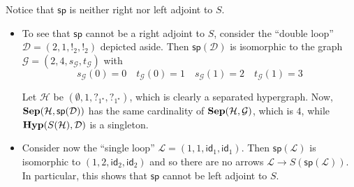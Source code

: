 \documentclass[3p]{elsarticle}
\newcommand{\catname}[1]{\textbf{\textup{#1}}}
\newcommand{\hyp}{\catname{Hyp}}
\newcommand{\shyp}{\catname{Sep}}
\renewcommand{\sp}{\mathsf{sp}}
\newcommand{\id}[1]{\mathsf{id}_{#1}}
\theoremstyle{remark}
\theoremstyle{definition}
\begin{document}
\noindent 
\begin{minipage}[l]{.68\linewidth}
\begin{rem}Notice that $\sp$ is neither right nor left adjoint to $S$.
	\begin{itemize}
		\item To see that $\sp$ cannot be a right adjoint to $S$, consider the ``double loop'' $\mathcal{D}=(2, 1, !_2, !_2)$ depicted aside. Then $\sp(\mathcal{D})$ is isomorphic to the graph $\mathcal{G}=(2, 4, s_{\mathcal{G}}, t_{\mathcal{G}})$ with
		\[s_{\mathcal{G}}(0) = 0 \quad  t_{\mathcal{G}}(0) =  1 \quad  s_{\mathcal{G}}(1) = 2 \quad  t_{\mathcal{G}}(1) = 3 \]
		
		Let $\mathcal{H}$ be $(\emptyset, 1, ?_{1^\star}, ?_{1^\star})$, which is clearly a separated hypergraph. Now,  $\shyp(\mathcal{H}, \sp(\mathcal{D}))$ has the same cardinality of  $\shyp(\mathcal{H}, \mathcal{G})$, which is $4$, while $\hyp(S(\mathcal{H}), \mathcal{D})$ is a singleton.
		\item Consider now the ``single loop'' $\mathcal{L}=(1, 1, \id{1}, \id{1})$. Then $\sp(\mathcal{L})$ is isomorphic to $(1, 2, \id{2}, \id{2})$ and so there are no arrows $\mathcal{L}\to S(\sp(\mathcal{L}))$. In particular, this shows that $\sp$ cannot be left adjoint to $S$. 
	\end{itemize} 
\end{rem}
\end{minipage}
\hfill
\end{document}
